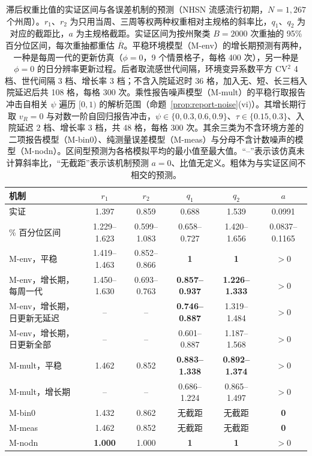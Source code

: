 \begin{table}[!tbp]
  \centering
  \caption{滞后权重比值的实证区间与各误差机制的预测（NHSN 流感流行初期，$N=1{,}267$ 个州周）。$r_1$、$r_2$ 为只用当周、三周等权两种权重相对主规格的斜率比，$q_1$、$q_2$ 为对应的截距比，$a$ 为主规格截距。实证区间为按州聚类 $B=2000$ 次重抽的 95\% 百分位区间，每次重抽都重估 $\overline{R}$。平稳环境模型（M-env）的增长期预测有两种，一种是每周一代的更新仿真（$\phi=0$，9 个情景格子，每格 400 次），另一种是 $\phi=0$ 的日分辨率更新过程。后者取流感世代间隔，环境变异系数平方 CV$^2$ 4 档、世代间隔 3 档、增长率 3 档；不含入院延迟时 36 格，加入无、短、长三档入院延迟后共 108 格，每格 300 次。乘性报告噪声模型（M-mult）的平稳行取报告冲击自相关 $\psi$ 遍历 $[0,1)$ 的解析范围（命题~\ref{prop:report-noise}(vi)）。其增长期行取 $v_R=0$ 与对数一阶自回归报告冲击，$\psi\in\{0,0.3,0.6,0.9\}$、$\tau\in\{0.15,0.3\}$、入院延迟 2 档、增长率 3 档，共 48 格，每格 300 次。其余三类为不含环境方差的二项报告模型（M-bin0）、纯测量误差模型（M-meas）与分母不含计数噪声的模型（M-nodn）。区间型预测为各格模拟平均的最小值至最大值。“--”表示该仿真未计算斜率比，“无截距”表示该机制预测 $a=0$、比值无定义。粗体为与实证区间不相交的预测。}
  \label{tab:ratios}
  \footnotesize
  \setlength{\tabcolsep}{4pt}
  \begin{tabular}{@{}lccccc@{}}
    \toprule
    机制 & $r_1$ & $r_2$ & $q_1$ & $q_2$ & $a$ \\
    \midrule
    实证 & 1.397 & 0.859 & 0.688 & 1.539 & 0.0991 \\
    \quad 95\% 百分位区间 & 1.229--1.623 & 0.599--1.083 & 0.658--0.727 & 1.420--1.656 & 0.0837--0.1165 \\
    \midrule
    M-env，平稳 & 1.419--1.463 & 0.852--0.866 & \textbf{1} & \textbf{1} & $>0$ \\
    M-env，增长期，每周一代 & 1.450--1.630 & 0.693--0.763 & \textbf{0.857--0.937} & \textbf{1.226--1.333} & $>0$ \\
    M-env，增长期，日更新无延迟 & -- & -- & \textbf{0.746--0.887} & 1.319--1.484 & $>0$ \\
    M-env，增长期，日更新全部 & -- & -- & 0.601--0.887 & 1.187--1.568 & $>0$ \\
    M-mult，平稳 & 1.462 & 0.852 & \textbf{0.883--1.338} & \textbf{0.892--1.374} & $>0$ \\
    M-mult，增长期 & -- & -- & 0.686--1.224 & 0.865--1.497 & $>0$ \\
    M-bin0 & 1.432 & 0.862 & 无截距 & 无截距 & \textbf{0} \\
    M-meas & 1.462 & 0.852 & 无截距 & 无截距 & \textbf{0} \\
    M-nodn & \textbf{1.000} & 1.000 & \textbf{1} & \textbf{1} & $>0$ \\
    \bottomrule
  \end{tabular}
\end{table}
